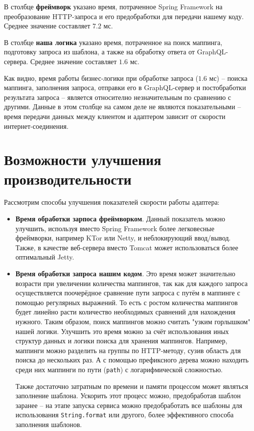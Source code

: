 В столбце \textbf{фреймворк} указано время, потраченное Spring Framework на преобразование HTTP-запроса и его предобработки для передачи нашему коду.
Среднее значение составляет $7.2$ мс.

В столбце \textbf{наша логика} указано время, потраченное на поиск маппинга, подготовку запроса из шаблона, а также на обработку ответа от GraphQL-сервера.
Среднее значение составляет $1.6$ мс.

Как видно, время работы бизнес-логики при обработке запроса ($1.6$ мс) -- поиска маппинга, заполнения запроса, отправки его в GraphQL-сервер и постобработки результата запроса -- является относително незначительным по сравнению с другими.
Данные в этом столбце на самом деле не являются показательными -- время передачи данных между клиентом и адаптером зависит от скорости интернет-соединения.


\section{Возможности улучшения производительности} \label{sec:ch4-performance-improve}

Рассмотрим способы улучшения показателей скорости работы адаптера:

\begin{itemize}
	\item \textbf{Время обработки зарпоса фреймворком}.
		Данный показатель можно улучшить, используя вместо Spring Framework более легковесные фреймворки, например KTor или Netty, и неблокирующий ввод/вывод.
		Также, в качестве веб-сервера вместо Tomcat может использоваться более оптимальный Jetty.

	\item \textbf{Время обработки запроса нашим кодом}.
		Это время может значительно возрасти при увеличении количества маппингов, так как для каждого запроса осуществляется поочерёдное сравнение пути запроса с путём в маппинге с помощью регулярных выражений.
То есть с ростом количества маппингов будет линейно расти количество необходимых сравнений для нахождения нужного.
Таким образом, поиск маппингов можно считать "узким горлышком" нашей логики.
Улучшить это время можно за счёт использования иных структур данных и логики поиска для хранения маппингов.
Например, маппинги можно разделить на группы по HTTP-методу, сузив область для поиска до нескольких раз.
А с помощью префиксного дерева можно находить среди них маппинги по пути (\texttt{path}) с логарифмической сложностью.

	Также достаточно затратным по времени и памяти процессом может являться заполнение шаблона.
	Ускорить этот процесс можно, предобработав шаблон заранее -- на этапе запуска сервиса можно предобработать все шаблоны для использования \texttt{String.format} или другого, более эффективного способа заполнения шаблонов.
\end{itemize}

